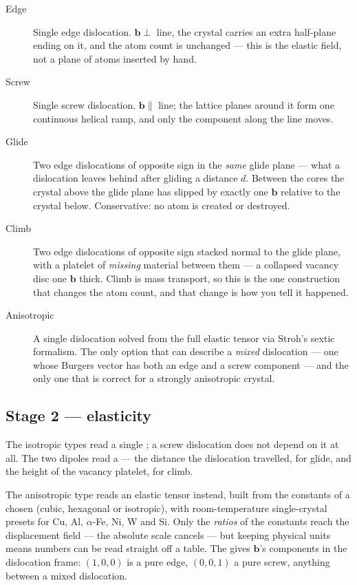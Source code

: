 \begin{description}
  \item[Edge] Single edge dislocation. $\mathbf{b} \perp$ line, the
    crystal carries an extra half-plane ending on it, and the atom count
    is unchanged --- this is the elastic field, not a plane of atoms
    inserted by hand.
  \item[Screw] Single screw dislocation. $\mathbf{b} \parallel$ line; the
    lattice planes around it form one continuous helical ramp, and only
    the component along the line moves.
  \item[Glide] Two edge dislocations of opposite sign in the \emph{same}
    glide plane --- what a dislocation leaves behind after gliding a
    distance $d$. Between the cores the crystal above the glide plane has
    slipped by exactly one $\mathbf{b}$ relative to the crystal below.
    Conservative: no atom is created or destroyed.
  \item[Climb] Two edge dislocations of opposite sign stacked normal to
    the glide plane, with a platelet of \emph{missing} material between
    them --- a collapsed vacancy disc one $\mathbf{b}$ thick. Climb is
    mass transport, so this is the one construction that changes the atom
    count, and that change is how you tell it happened.
  \item[Anisotropic] A single dislocation solved from the full elastic
    tensor via Stroh's sextic formalism. The only option that can describe
    a \emph{mixed} dislocation --- one whose Burgers vector has both an
    edge and a screw component --- and the only one that is correct for a
    strongly anisotropic crystal.
\end{description}

\subsection{Stage 2 --- elasticity}

The isotropic types read a single ; a screw dislocation
does not depend on it at all. The two dipoles read a 
--- the distance the dislocation travelled, for glide, and the height of
the vacancy platelet, for climb.

The anisotropic type reads an elastic tensor instead, built from the
constants of a chosen  (cubic, hexagonal or
isotropic), with room-temperature single-crystal presets for Cu, Al,
$\alpha$-Fe, Ni, W and Si. Only the \emph{ratios} of the constants reach
the displacement field --- the absolute scale cancels --- but keeping
physical units means numbers can be read straight off a table. The
 gives $\mathbf{b}$'s components in the dislocation
frame: $(1,0,0)$ is a pure edge, $(0,0,1)$ a pure screw, anything between
a mixed dislocation.

